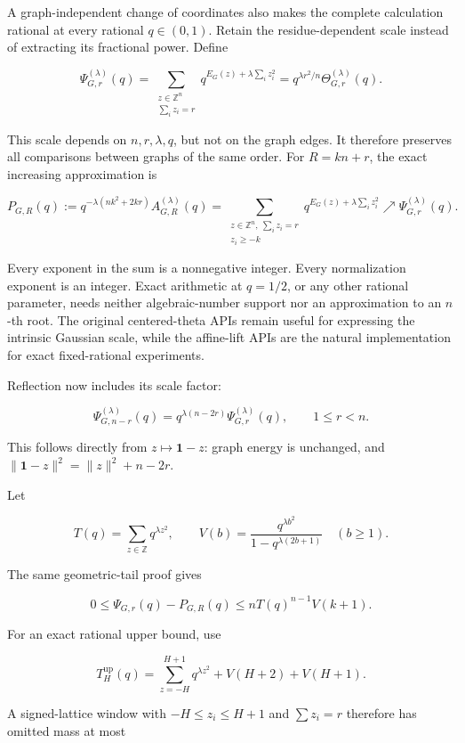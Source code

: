 \documentclass[
  11pt,
  a4paper,
]{report}
\begin{document}
A graph-independent change of coordinates also makes the complete
calculation rational at every rational \(q\in(0,1)\). Retain the
residue-dependent scale instead of extracting its fractional power.
Define

\[
 \Psi_{G,r}^{(\lambda)}(q)
 =\sum_{\substack{z\in\mathbb Z^n\\\sum_i z_i=r}}
 q^{E_G(z)+\lambda\sum_i z_i^2}
 =q^{\lambda r^2/n}\Theta_{G,r}^{(\lambda)}(q).
 \tag{16}
\]

This scale depends on \(n,r,\lambda,q\), but not on the graph edges. It
therefore preserves all comparisons between graphs of the same order.
For \(R=kn+r\), the exact increasing approximation is

\[
 P_{G,R}(q)
 :=q^{-\lambda(nk^2+2kr)}A_{G,R}^{(\lambda)}(q)
 =\sum_{\substack{z\in\mathbb Z^n,\ \sum_i z_i=r\\z_i\ge-k}}
 q^{E_G(z)+\lambda\sum_i z_i^2}
 \nearrow\Psi_{G,r}^{(\lambda)}(q).
 \tag{17}
\]

Every exponent in the sum is a nonnegative integer. Every normalization
exponent is an integer. Exact arithmetic at \(q=1/2\), or any other
rational parameter, needs neither algebraic-number support nor an
approximation to an \(n\)-th root. The original centered-theta APIs
remain useful for expressing the intrinsic Gaussian scale, while the
affine-lift APIs are the natural implementation for exact fixed-rational
experiments.

Reflection now includes its scale factor:

\[
 \boxed{\Psi_{G,n-r}^{(\lambda)}(q)
 =q^{\lambda(n-2r)}\Psi_{G,r}^{(\lambda)}(q),\qquad1\le r<n.}
 \tag{18}
\]

This follows directly from \(z\mapsto\mathbf1-z\): graph energy is
unchanged, and \(\|\mathbf1-z\|^2=\|z\|^2+n-2r\).

Let

\[
 T(q)=\sum_{z\in\mathbb Z}q^{\lambda z^2},
 \qquad
 V(b)=\frac{q^{\lambda b^2}}{1-q^{\lambda(2b+1)}}
 \quad(b\ge1).
\]

The same geometric-tail proof gives

\[
 0\le\Psi_{G,r}(q)-P_{G,R}(q)
 \le nT(q)^{n-1}V(k+1).
 \tag{19}
\]

For an exact rational upper bound, use

\[
 T^{\mathrm{up}}_H(q)
 =\sum_{z=-H}^{H+1}q^{\lambda z^2}+V(H+2)+V(H+1).
 \tag{20}
\]

A signed-lattice window with \(-H\le z_i\le H+1\) and \(\sum z_i=r\)
therefore has omitted mass at most
\end{document}
